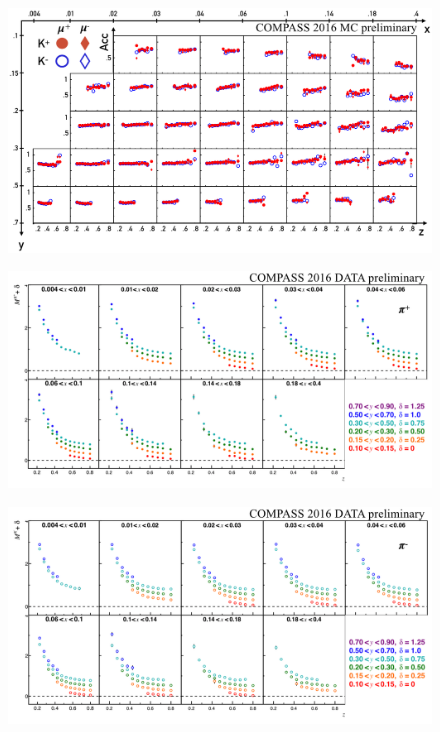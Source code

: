 \documentclass[letterpaper,12pt]{article}
\begin{document}
\begin{figure}
	\includegraphics[scale=0.5]{./gfx/AccK.png}
	\caption{}
	\label{AccK}
\end{figure}

\begin{figure}
	\includegraphics[scale=0.5]{./gfx/Pip.png}
	\caption{}
	\label{Pip}
\end{figure}

\begin{figure}
	\includegraphics[scale=0.5]{./gfx/Pim.png}
	\caption{}
	\label{Pim}
\end{figure}
\end{document}
